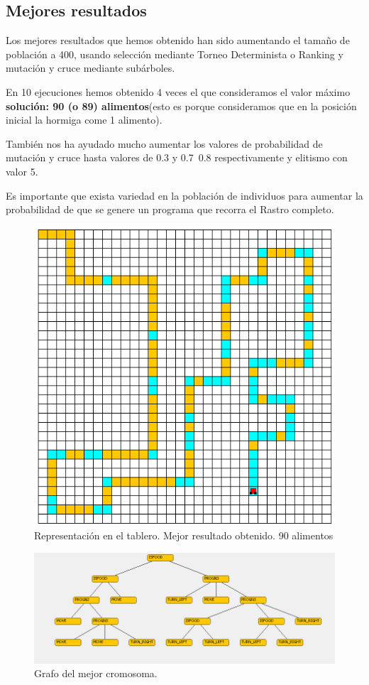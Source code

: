 \documentclass{article}
\begin{document}
\newpage
\newpage
\subsection{Mejores resultados}
Los mejores resultados que hemos obtenido han sido aumentando el tamaño de población a 400, usando selección mediante Torneo Determinista o Ranking y mutación y cruce mediante subárboles.\par
En 10 ejecuciones hemos obtenido 4 veces el que consideramos el valor máximo \textbf{solución: 90 (o 89) alimentos}(esto es porque consideramos que en la posición inicial la hormiga come 1 alimento). \par También nos ha ayudado mucho aumentar los valores de probabilidad de mutación y cruce hasta valores de 0.3 y 0.7~0.8 respectivamente y elitismo con valor 5.
\par Es importante que exista variedad en la población de individuos para aumentar la probabilidad de que se genere un programa que recorra el Rastro completo.
\begin{figure}[h]
	\centering
	\includegraphics[scale=0.35]{./images/3fin1.png}
	\caption{Representación en el tablero. Mejor resultado obtenido. 90 alimentos}
\end{figure}

\begin{figure}[h]
	\centering
	\includegraphics[scale=0.35]{./images/3fin2.png}
	\caption{Grafo del mejor cromosoma.}
\end{figure}
\end{document}
